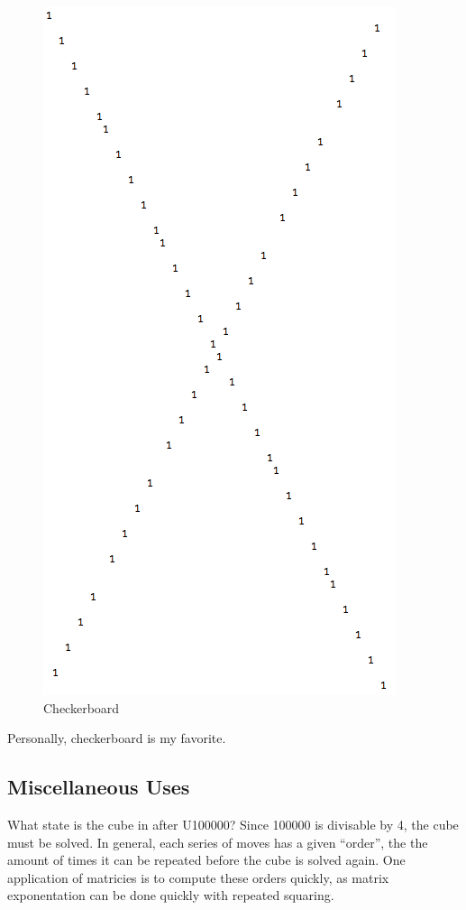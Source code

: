 \documentclass[11pt, oneside]{article}
\theoremstyle{plain}
\begin{document}
\begin{figure}[h!]
\centering
\includegraphics[scale=0.3]{checker}
\caption{Checkerboard}
\end{figure}

Personally, checkerboard is my favorite.

\newpage
\newpage

\subsection{Miscellaneous Uses}

What state is the cube in after U100000? Since 100000 is divisable by 4,
the cube must be solved. In general, each series of moves has a given ``order'',
the the amount of times it can be repeated before the cube is solved again.
One application of matricies is to compute these orders quickly,
as matrix exponentation can be done quickly with repeated squaring.
\end{document}
